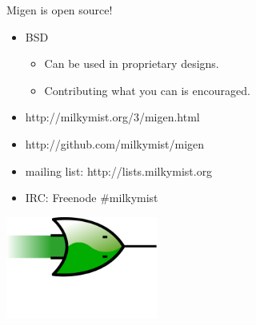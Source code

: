 \documentclass[serif,mathserif]{beamer}
\begin{document}
\begin{frame}
Migen is open source!
\begin{itemize}
\item BSD
\begin{itemize}
\item Can be used in proprietary designs.
\item Contributing what you can is encouraged.
\end{itemize}
\item http://milkymist.org/3/migen.html
\item http://github.com/milkymist/migen
\item mailing list: http://lists.milkymist.org
\item IRC: Freenode \#milkymist
\end{itemize}

\centering \includegraphics[width=5cm]{migen_logo.png}

\end{frame}
\end{document}
